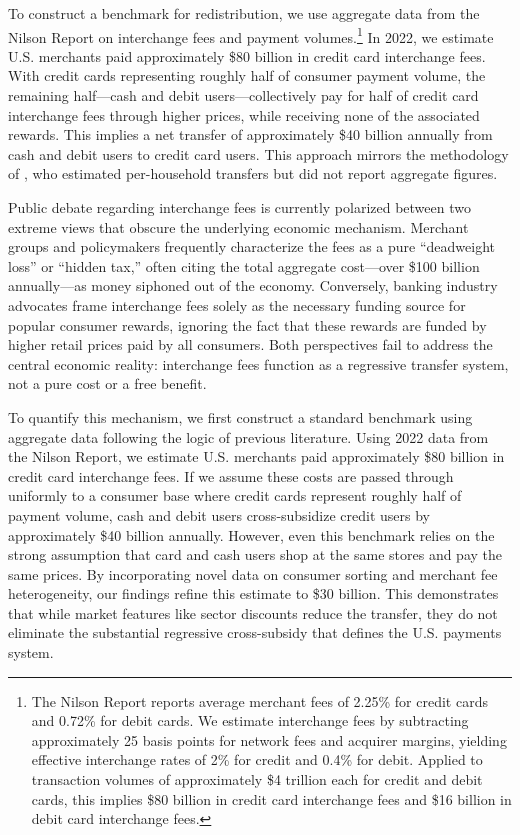 

To construct a benchmark for redistribution, we use aggregate data from the Nilson Report on interchange fees and payment volumes.\footnote{The Nilson Report reports average merchant fees of 2.25\% for credit cards and 0.72\% for debit cards.
We estimate interchange fees by subtracting approximately 25 basis points for network fees and acquirer margins, yielding effective interchange rates of 2\% for credit and 0.4\% for debit.
Applied to transaction volumes of approximately \$4 trillion each for credit and debit cards, this implies \$80 billion in credit card interchange fees and \$16 billion in debit card interchange fees.} In 2022, we estimate U.S. merchants paid approximately \$80 billion in credit card interchange fees.
With credit cards representing roughly half of consumer payment volume, the remaining half---cash and debit users---collectively pay for half of credit card interchange fees through higher prices, while receiving none of the associated rewards.
This implies a net transfer of approximately \$40 billion annually from cash and debit users to credit card users.
This approach mirrors the methodology of \citet{SchuhShyStavins2010}, who estimated per-household transfers but did not report aggregate figures.


Public debate regarding interchange fees is currently polarized between two extreme views that obscure the underlying economic mechanism.
Merchant groups and policymakers frequently characterize the fees as a pure ``deadweight loss'' or ``hidden tax,'' often citing the total aggregate cost---over \$100 billion annually---as money siphoned out of the economy.
Conversely, banking industry advocates frame interchange fees solely as the necessary funding source for popular consumer rewards, ignoring the fact that these rewards are funded by higher retail prices paid by all consumers.
Both perspectives fail to address the central economic reality: interchange fees function as a regressive transfer system, not a pure cost or a free benefit.

To quantify this mechanism, we first construct a standard benchmark using aggregate data following the logic of previous literature.
Using 2022 data from the Nilson Report, we estimate U.S. merchants paid approximately \$80 billion in credit card interchange fees.
If we assume these costs are passed through uniformly to a consumer base where credit cards represent roughly half of payment volume, cash and debit users cross-subsidize credit users by approximately \$40 billion annually.
However, even this benchmark relies on the strong assumption that card and cash users shop at the same stores and pay the same prices.
By incorporating novel data on consumer sorting and merchant fee heterogeneity, our findings refine this estimate to \$30 billion.
This demonstrates that while market features like sector discounts reduce the transfer, they do not eliminate the substantial regressive cross-subsidy that defines the U.S. payments system.
